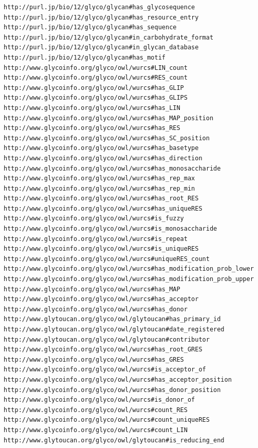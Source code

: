 \documentclass[12pt,a4paper]{article}
\begin{document}
\newpage
\singlespace
{\scriptsize
\begin{verbatim}
http://purl.jp/bio/12/glyco/glycan#has_glycosequence
http://purl.jp/bio/12/glyco/glycan#has_resource_entry
http://purl.jp/bio/12/glyco/glycan#has_sequence
http://purl.jp/bio/12/glyco/glycan#in_carbohydrate_format
http://purl.jp/bio/12/glyco/glycan#in_glycan_database
http://purl.jp/bio/12/glyco/glycan#has_motif
http://www.glycoinfo.org/glyco/owl/wurcs#LIN_count
http://www.glycoinfo.org/glyco/owl/wurcs#RES_count
http://www.glycoinfo.org/glyco/owl/wurcs#has_GLIP
http://www.glycoinfo.org/glyco/owl/wurcs#has_GLIPS
http://www.glycoinfo.org/glyco/owl/wurcs#has_LIN
http://www.glycoinfo.org/glyco/owl/wurcs#has_MAP_position
http://www.glycoinfo.org/glyco/owl/wurcs#has_RES
http://www.glycoinfo.org/glyco/owl/wurcs#has_SC_position
http://www.glycoinfo.org/glyco/owl/wurcs#has_basetype
http://www.glycoinfo.org/glyco/owl/wurcs#has_direction
http://www.glycoinfo.org/glyco/owl/wurcs#has_monosaccharide
http://www.glycoinfo.org/glyco/owl/wurcs#has_rep_max
http://www.glycoinfo.org/glyco/owl/wurcs#has_rep_min
http://www.glycoinfo.org/glyco/owl/wurcs#has_root_RES
http://www.glycoinfo.org/glyco/owl/wurcs#has_uniqueRES
http://www.glycoinfo.org/glyco/owl/wurcs#is_fuzzy
http://www.glycoinfo.org/glyco/owl/wurcs#is_monosaccharide
http://www.glycoinfo.org/glyco/owl/wurcs#is_repeat
http://www.glycoinfo.org/glyco/owl/wurcs#is_uniqueRES
http://www.glycoinfo.org/glyco/owl/wurcs#uniqueRES_count
http://www.glycoinfo.org/glyco/owl/wurcs#has_modification_prob_lower
http://www.glycoinfo.org/glyco/owl/wurcs#has_modification_prob_upper
http://www.glycoinfo.org/glyco/owl/wurcs#has_MAP
http://www.glycoinfo.org/glyco/owl/wurcs#has_acceptor
http://www.glycoinfo.org/glyco/owl/wurcs#has_donor
http://www.glytoucan.org/glyco/owl/glytoucan#has_primary_id
http://www.glytoucan.org/glyco/owl/glytoucan#date_registered
http://www.glytoucan.org/glyco/owl/glytoucan#contributor
http://www.glycoinfo.org/glyco/owl/wurcs#has_root_GRES
http://www.glycoinfo.org/glyco/owl/wurcs#has_GRES
http://www.glycoinfo.org/glyco/owl/wurcs#is_acceptor_of
http://www.glycoinfo.org/glyco/owl/wurcs#has_acceptor_position
http://www.glycoinfo.org/glyco/owl/wurcs#has_donor_position
http://www.glycoinfo.org/glyco/owl/wurcs#is_donor_of
http://www.glycoinfo.org/glyco/owl/wurcs#count_RES
http://www.glycoinfo.org/glyco/owl/wurcs#count_uniqueRES
http://www.glycoinfo.org/glyco/owl/wurcs#count_LIN
http://www.glytoucan.org/glyco/owl/glytoucan#is_reducing_end
\end{verbatim}
}
\doublespace
\end{document}

